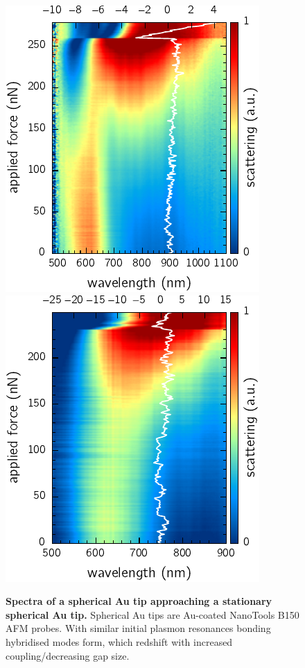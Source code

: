 \documentclass[a4paper]{article}
\begin{document}
\begin{figure}
\centering
\includegraphics{figures/classical_tip_dimer_1}~
\includegraphics{figures/classical_tip_dimer_2}
\caption[Spectra of a spherical Au tip approaching a stationary spherical Au tip]{\textbf{Spectra of a spherical Au tip approaching a stationary spherical Au tip.} Spherical Au tips are Au-coated NanoTools B150 AFM probes. With similar initial plasmon resonances bonding hybridised modes form, which redshift with increased coupling/decreasing gap size.}
\label{fig:spherical_tip_dimer_scan}
\end{figure}
\end{document}
